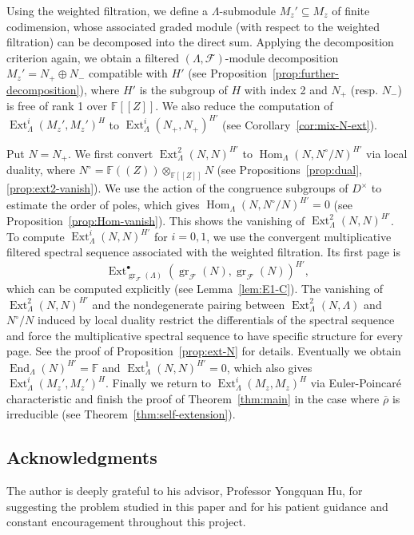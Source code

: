 \documentclass[11pt,a4paper]{article} %
\def\FF{\mathbb{F}}
\def\cF{\mathcal{F}}
\def\End{\operatorname{End}}
\def\Ext{\operatorname{Ext}} %
\def\gr{\operatorname{gr}}
\def\Hom{\operatorname{Hom}}
\def\rhobar{\overline{\rho}}
\begin{document}
Using the weighted filtration, we define a $\Lambda$-submodule $M_z'\subseteq M_z$ of finite codimension, whose associated graded module (with respect to the weighted filtration) can be decomposed into the direct sum. Applying the decomposition criterion again, we obtain a filtered $(\Lambda,\cF)$-module decomposition $M_z'=N_+\oplus N_-$ compatible with $H'$ (see Proposition~\ref{prop:further-decomposition}), where $H'$ is the subgroup of $H$ with index 2 and $N_+$ (resp. $N_-$) is free of rank 1 over $\FF[[Z]]$. We also reduce the computation of $\Ext^i_\Lambda(M_z',M_z')^H$ to $\Ext^i_\Lambda(N_+,N_+)^{H'}$ (see Corollary~\ref{cor:mix-N-ext}).

Put $N=N_+$. We first convert $\Ext^2_\Lambda(N,N)^{H'}$ to $\Hom_\Lambda(N,N^\circ/N)^{H'}$ via local duality, where $N^\circ=\FF((Z))\otimes_{\FF[[Z]]}N$ (see Propositions~\ref{prop:dual}, \ref{prop:ext2-vanish}). We use the action of the congruence subgroups of $D^\times$ to estimate the order of poles, which gives $\Hom_\Lambda(N,N^\circ/N)^{H'}=0$ (see Proposition~\ref{prop:Hom-vanish}). This shows the vanishing of $\Ext^2_\Lambda(N,N)^{H'}$. To compute $\Ext^i_\Lambda(N,N)^{H'}$ for $i=0,1$, we use the convergent multiplicative filtered spectral sequence associated with the weighted filtration. Its first page is 
\[
\Ext^\bullet_{\gr_\cF(\Lambda)}\left(\gr_\cF(N),\gr_\cF(N)\right)^{H'},
\]
which can be computed explicitly (see Lemma~\ref{lem:E1-C}). The vanishing of $\Ext^2_\Lambda(N,N)^{H'}$ and the nondegenerate pairing between $\Ext^2_\Lambda(N,\Lambda)$ and $N^\circ/N$ induced by local duality restrict the differentials of the spectral sequence and force the multiplicative spectral sequence to have specific structure for every page. See the proof of Proposition~\ref{prop:ext-N} for details. Eventually we obtain $\End_\Lambda(N)^{H'}=\FF$ and $\Ext^1_\Lambda(N,N)^{H'}=0$, which also gives $\Ext^i_\Lambda(M_z',M_z')^H$. Finally we return to $\Ext^i_\Lambda(M_z,M_z)^H$ via Euler-Poincar\'e characteristic and finish the proof of Theorem~\ref{thm:main} in the case where $\rhobar$ is irreducible (see Theorem~\ref{thm:self-extension}).

\subsection*{Acknowledgments}
The author is deeply grateful to his advisor, Professor Yongquan Hu, for suggesting the problem studied in this paper and for his patient guidance and constant encouragement throughout this project.
 
\end{document}
